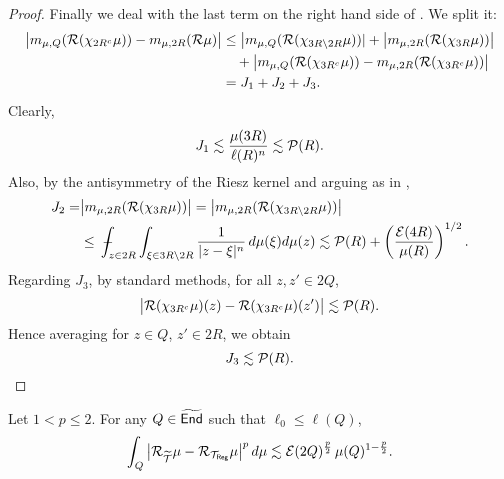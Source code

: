 \begin{proof}
Finally we deal with the last term on the right hand side of . We split it:
\begin{align*}
\big|m_{\mu,Q}({\mathcal R}(\chi_{2R^c}\mu))- m_{\mu,2R}({\mathcal R}\mu)\big|
& \leq \big|m_{\mu,Q}({\mathcal R}(\chi_{3R\setminus 2R}\mu))| + \big|m_{\mu,2R}({\mathcal R}(\chi_{3R}\mu))\big|\\
&\quad +
\big|m_{\mu,Q}({\mathcal R}(\chi_{3R^c}\mu))- m_{\mu,2R}({\mathcal R}(\chi_{3R^c}\mu))\big| \\
& = J_1 + J_2 + J_3.
\end{align*}
Clearly,
$$J_1\lesssim \frac{\mu(3R)}{\ell(R)^n}\lesssim {\mathcal P}(R).$$
Also, by the antisymmetry of the Riesz kernel and arguing as in ,
\begin{align*}
J_2=& \big|m_{\mu,2R}(\RR(\chi_{3R}\mu))\big| = \big|m_{\mu,2R}(\RR(\chi_{3R\setminus 2R}\mu))\big| 
\\
& \leq  \avint_{z\in 2R}\int_{\xi\in 3R\setminus 2R}\frac1{|z-\xi|^n}\,d\mu(\xi)d\mu(z)
\lesssim \PP(R)+\left(\frac{\EE(4R)}{\mu(R)}\right)^{1/2}.
\end{align*}
Regarding $J_3$, by standard methods, for all $z,z'\in 2Q$, 
$$\big|{\mathcal R}(\chi_{3R^c}\mu)(z) - {\mathcal R}(\chi_{3R^c}\mu)(z')\big| \lesssim {\mathcal P}(R).$$
Hence averaging for $z\in Q$, $z'\in 2R$, we obtain
$$J_3\lesssim {\mathcal P}(R).$$
\end{proof}

\vv


\begin{lemma}\label{lemaprox3}
Let $1<p\leq2$.
For any $Q\in{\widetilde{{\mathsf{End}}}}$ such that $\ell_0\leq \ell(Q)$,
$$\int_Q \big|{\mathcal R}_{{\widetilde{{\mathcal T}}}}\mu - {\mathcal R}_{{\mathcal T}_{\mathsf{Reg}}}\mu\big|^p\,d\mu \lesssim {\mathcal E}(2Q)^{\frac p2} \,\mu(Q)^{1-\frac p2}.$$
\end{lemma}


